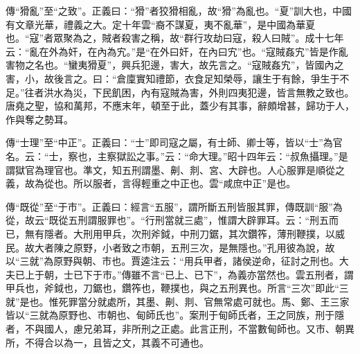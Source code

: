 {\noindent\zhuan{}\fzbyks 傳“猾亂”至“之致”。正義曰：“猾”者狡猾相亂，故“猾”為亂也。“夏”訓大也，中國有文章光華，禮義之大。定十年雲“裔不謀夏，夷不亂華”，是中國為華夏也。“寇”者眾聚為之，賊者殺害之稱，故“群行攻劫曰寇，殺人曰賊”。成十七年云：“亂在外為奸，在內為宄。”是“在外曰奸，在內曰宄”也。“寇賊姦宄”皆是作亂害物之名也。“蠻夷猾夏”，興兵犯邊，害大，故先言之。“寇賊姦宄”，皆國內之害，小，故後言之。曰：“倉廩實知禮節，衣食足知榮辱，讓生于有餘，爭生于不足。”往者洪水為災，下民飢困，內有寇賊為害，外則四夷犯邊，皆言無教之致也。唐堯之聖，協和萬邦，不應末年，頓至于此，蓋少有其事，辭頗增甚，歸功于人，作與奪之勢耳。 \par}

{\noindent\zhuan{}\fzbyks 傳“士理”至“中正”。正義曰：“士”即司寇之屬，有士師、卿士等，皆以“士”為官名。云：“士，察也，主察獄訟之事。”云：“命大理。”昭十四年云：“叔魚攝理。”是謂獄官為理官也。準文，知五刑謂墨、劓、剕、宮、大辟也。人心服罪是順從之義，故為從也。所以服者，言得輕重之中正也。雲“咸庶中正”是也。 \par}

{\noindent\zhuan{}\fzbyks 傳“既從”至“于市”。正義曰：經言“五服”，謂所斷五刑皆服其罪，傳既訓“服”為從，故云“既從五刑謂服罪也”。“行刑當就三處”，惟謂大辟罪耳。云：“刑五而已，無有隱者。大刑用甲兵，次刑斧鉞，中刑刀鋸，其次鑽筰，薄刑鞭撲，以威民。故大者陳之原野，小者致之市朝，五刑三次，是無隱也。”孔用彼為說，故以“三就”為原野與朝、市也。賈逵注云：“用兵甲者，諸侯逆命，征討之刑也。大夫已上于朝，士已下于市。”傳雖不言“已上、已下”，為義亦當然也。雲五刑者，謂甲兵也，斧鉞也，刀鋸也，鑽筰也，鞭撲也，與之五刑異也。所言“三次”即此“三就”是也。惟死罪當分就處所，其墨、劓、剕、官無常處可就也。馬、鄭、王三家皆以“三就為原野也、市朝也、甸師氏也”。案刑于甸師氏者，王之同族，刑于隱者，不與國人，慮兄弟耳，非所刑之正處。此言正刑，不當數甸師也。又市、朝異所，不得合以為一，且皆之文，其義不可通也。 \par}

